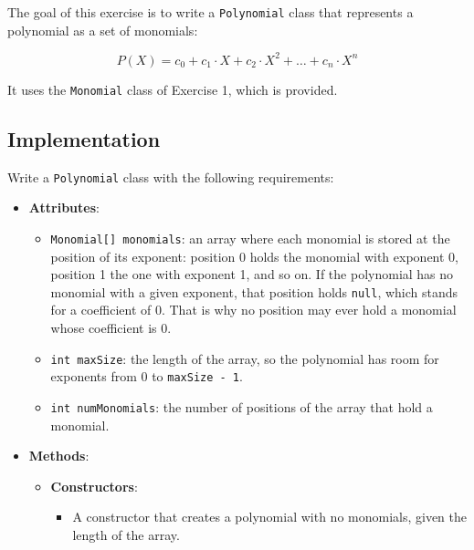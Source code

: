 The goal of this exercise is to write a \texttt{Polynomial} class that represents a polynomial as a set of monomials:

\[
    P(X) = c_0 + c_1 \cdot X + c_2 \cdot X^2 + \dots + c_n \cdot X^n
\]

It uses the \texttt{Monomial} class of Exercise 1, which is provided.

\subsection{Implementation}

Write a \texttt{Polynomial} class with the following requirements:

\begin{itemize}

    \item \textbf{Attributes}:

        \begin{itemize}

            \item \texttt{Monomial[] monomials}: an array where each monomial is stored at the position of its exponent: position 0 holds the monomial with exponent 0, position 1 the one with exponent 1, and so on. If the polynomial has no monomial with a given exponent, that position holds \texttt{null}, which stands for a coefficient of 0. That is why no position may ever hold a monomial whose coefficient is 0.

            \item \texttt{int maxSize}: the length of the array, so the polynomial has room for exponents from 0 to \texttt{maxSize - 1}.

            \item \texttt{int numMonomials}: the number of positions of the array that hold a monomial.

        \end{itemize}

    \item \textbf{Methods}:

        \begin{itemize}

            \item \textbf{Constructors}:

                \begin{itemize}

                    \item A constructor that creates a polynomial with no monomials, given the length of the array.


\end{itemize}
\end{itemize}
\end{itemize}

